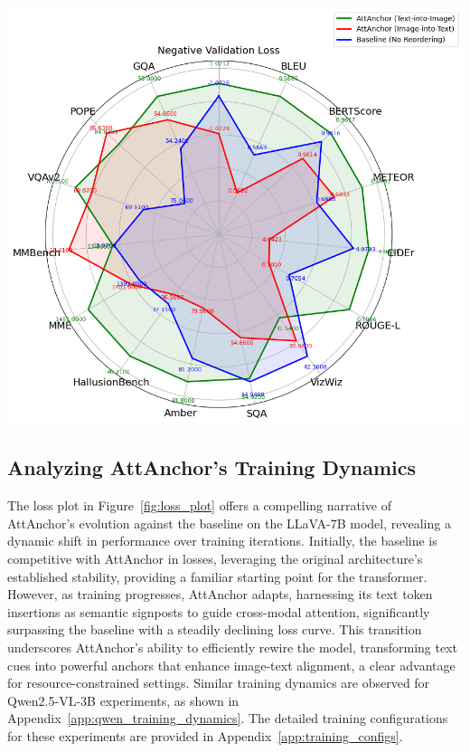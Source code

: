 \documentclass[11pt]{article}
\begin{document}
\begin{minipage}[t]{0.48\textwidth}
    \centering
    
    \label{fig:radarcos}
    \vspace{0.5em}
    \includegraphics[width=1.2\linewidth]{iclr2026/compare3.png}
\end{minipage}










\subsection{Analyzing AttAnchor's Training Dynamics}

The loss plot in Figure~\ref{fig:loss_plot} offers a compelling narrative of AttAnchor's evolution against the baseline on the LLaVA-7B model, revealing a dynamic shift in performance over training iterations. Initially, the baseline is competitive with AttAnchor in losses, leveraging the original architecture's established stability, providing a familiar starting point for the transformer. However, as training progresses, AttAnchor adapts, harnessing its text token insertions as semantic signposts to guide cross-modal attention, significantly surpassing the baseline with a steadily declining loss curve. This transition underscores AttAnchor's ability to efficiently rewire the model, transforming text cues into powerful anchors that enhance image-text alignment, a clear advantage for resource-constrained settings. Similar training dynamics are observed for Qwen2.5-VL-3B experiments, as shown in Appendix~\ref{app:qwen_training_dynamics}. The detailed training configurations for these experiments are provided in Appendix~\ref{app:training_configs}.
\end{document}
